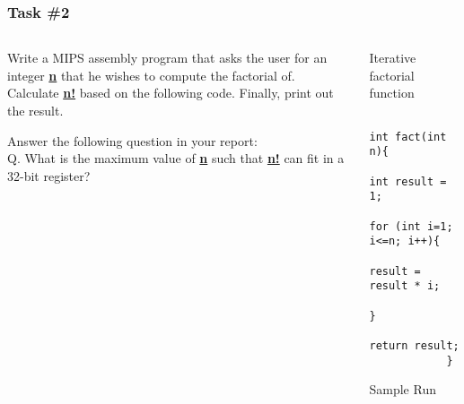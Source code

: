 \documentclass[
	10pt, %
	hmargin=1cm,vmargin=0cm,head=0.5cm,headsep=0pt,foot=0.5cm,margin=2cm
]{beamer}
\begin{document}
\begin{frame}[fragile]
	\frametitle{Task \#2}
	\begin{columns}[c]
		\begin{column}{0.5\textwidth}
			\justifying
			Write a MIPS assembly program that asks the user for an integer \underline{\textbf{n}} that he wishes to compute the factorial of. Calculate \underline{\textbf{n!}} based on the following code. Finally, print out the result.


			\vspace{0.3cm}
			Answer the following question in your report: \\


			Q. What is the maximum value of \underline{\textbf{n}} such that \underline{\textbf{n!}} can fit in a 32-bit register?
		\end{column}
		\begin{column}{0.5\textwidth}
		\centering
			\begin{listing}[H]
			\centering			
			\caption{Iterative factorial function}
			\begin{verbatim}
			int fact(int n){
				int result = 1;
				for (int i=1; i<=n; i++){
					result = result * i;
				}
				return result;
			}
			\end{verbatim}
			\end{listing}

			\vspace{0.15cm}
			\centering
			Sample Run 

			
		\end{column}
	\end{columns}
\end{frame}

\end{document}
